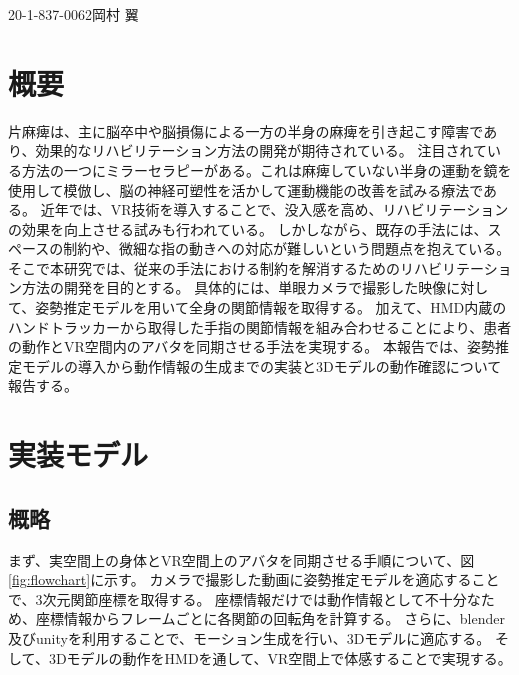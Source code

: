 

             {20-1-837-0062}{岡村 翼}




\section{概要}
\vspace{-1mm}
片麻痺は、主に脳卒中や脳損傷による一方の半身の麻痺を引き起こす障害であり、効果的なリハビリテーション方法の開発が期待されている。
注目されている方法の一つにミラーセラピーがある。これは麻痺していない半身の運動を鏡を使用して模倣し、脳の神経可塑性を活かして運動機能の改善を試みる療法である。
近年では、VR技術を導入することで、没入感を高め、リハビリテーションの効果を向上させる試みも行われている。
しかしながら、既存の手法には、スペースの制約や、微細な指の動きへの対応が難しいという問題点を抱えている。
そこで本研究では、従来の手法における制約を解消するためのリハビリテーション方法の開発を目的とする。
具体的には、単眼カメラで撮影した映像に対して、姿勢推定モデルを用いて全身の関節情報を取得する。
加えて、HMD内蔵のハンドトラッカーから取得した手指の関節情報を組み合わせることにより、患者の動作とVR空間内のアバタを同期させる手法を実現する。
本報告では、姿勢推定モデルの導入から動作情報の生成までの実装と3Dモデルの動作確認について報告する。

\vspace{-4.5mm}

\section{実装モデル}
\vspace{-2mm}
\subsection{概略}

まず、実空間上の身体とVR空間上のアバタを同期させる手順について、図\ref{fig:flowchart}に示す。
カメラで撮影した動画に姿勢推定モデルを適応することで、3次元関節座標を取得する。
座標情報だけでは動作情報として不十分なため、座標情報からフレームごとに各関節の回転角を計算する。
さらに、blender及びunityを利用することで、モーション生成を行い、3Dモデルに適応する。
そして、3Dモデルの動作をHMDを通して、VR空間上で体感することで実現する。

